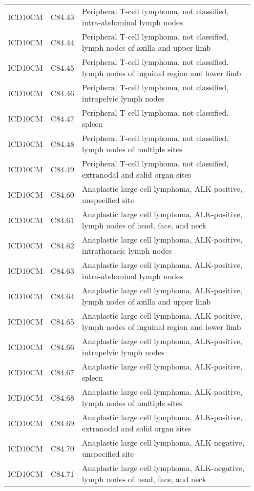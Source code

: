 \begin{longtable}{p{}p{}p{}}
  ICD10CM & C84.43 & Peripheral T-cell lymphoma, not classified, intra-abdominal lymph nodes \\ 
  ICD10CM & C84.44 & Peripheral T-cell lymphoma, not classified, lymph nodes of axilla and upper limb \\ 
  ICD10CM & C84.45 & Peripheral T-cell lymphoma, not classified, lymph nodes of inguinal region and lower limb \\ 
  ICD10CM & C84.46 & Peripheral T-cell lymphoma, not classified, intrapelvic lymph nodes \\ 
  ICD10CM & C84.47 & Peripheral T-cell lymphoma, not classified, spleen \\ 
  ICD10CM & C84.48 & Peripheral T-cell lymphoma, not classified, lymph nodes of multiple sites \\ 
  ICD10CM & C84.49 & Peripheral T-cell lymphoma, not classified, extranodal and solid organ sites \\ 
  ICD10CM & C84.60 & Anaplastic large cell lymphoma, ALK-positive, unspecified site \\ 
  ICD10CM & C84.61 & Anaplastic large cell lymphoma, ALK-positive, lymph nodes of head, face, and neck \\ 
  ICD10CM & C84.62 & Anaplastic large cell lymphoma, ALK-positive, intrathoracic lymph nodes \\ 
  ICD10CM & C84.63 & Anaplastic large cell lymphoma, ALK-positive, intra-abdominal lymph nodes \\ 
  ICD10CM & C84.64 & Anaplastic large cell lymphoma, ALK-positive, lymph nodes of axilla and upper limb \\ 
  ICD10CM & C84.65 & Anaplastic large cell lymphoma, ALK-positive, lymph nodes of inguinal region and lower limb \\ 
  ICD10CM & C84.66 & Anaplastic large cell lymphoma, ALK-positive, intrapelvic lymph nodes \\ 
  ICD10CM & C84.67 & Anaplastic large cell lymphoma, ALK-positive, spleen \\ 
  ICD10CM & C84.68 & Anaplastic large cell lymphoma, ALK-positive, lymph nodes of multiple sites \\ 
  ICD10CM & C84.69 & Anaplastic large cell lymphoma, ALK-positive, extranodal and solid organ sites \\ 
  ICD10CM & C84.70 & Anaplastic large cell lymphoma, ALK-negative, unspecified site \\ 
  ICD10CM & C84.71 & Anaplastic large cell lymphoma, ALK-negative, lymph nodes of head, face, and neck \\ 

\end{longtable}
